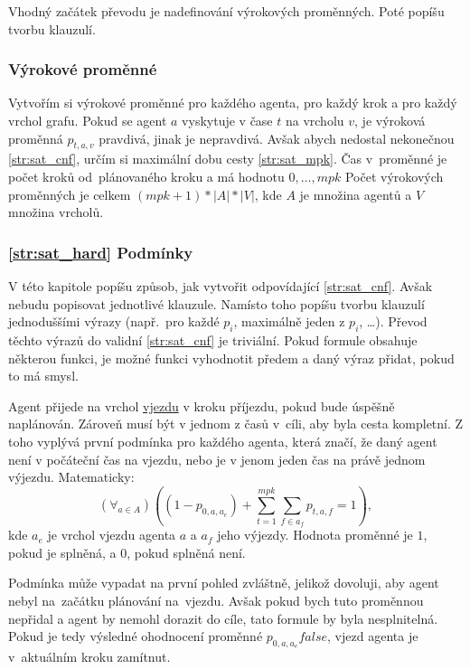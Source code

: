 Vhodný začátek převodu je nadefinování výrokových proměnných.
Poté popíšu tvorbu klauzulí.

\subsubsection{Výrokové proměnné}\label{subsubsec:sat_vyrokove_promenne}

Vytvořím si výrokové proměnné pro každého agenta, pro každý krok a pro každý vrchol grafu.
Pokud se agent $a$ vyskytuje v čase $t$ na vrcholu $v$, je výroková proměnná $p_{t,a,v}$ pravdivá, jinak je nepravdivá.
Avšak abych nedostal nekonečnou \ref{str:sat_cnf}, určím si maximální dobu cesty \ref{str:sat_mpk}.
Čas v~proměnné je počet kroků od~plánovaného kroku a má hodnotu ${0, \dots, mpk}$
Počet výrokových proměnných je celkem $(mpk + 1) * |A| * |V|$, kde $A$ je množina agentů a $V$ množina vrcholů.

\subsubsection{\ref{str:sat_hard} Podmínky}\label{subsubsec:sat_hard_podminky}

V této kapitole popíšu způsob, jak vytvořit odpovídající \ref{str:sat_cnf}.
Avšak nebudu popisovat jednotlivé klauzule.
Namísto toho popíšu tvorbu klauzulí jednoduššími výrazy (např.\ pro každé $p_i$, maximálně jeden z $p_i$, \ldots).
Převod těchto výrazů do validní \ref{str:sat_cnf} je triviální.
Pokud formule obsahuje některou funkci, je možné funkci vyhodnotit předem a daný výraz přidat, pokud to má smysl.

Agent přijede na vrchol \hyperref[par:vjezdy]{vjezdu} v kroku příjezdu, pokud bude úspěšně naplánován.
Zároveň musí být v jednom z časů v~cíli, aby byla cesta kompletní.
Z toho vyplývá první podmínka pro každého agenta, která značí, že daný agent není v počáteční čas na vjezdu,
nebo je v jenom jeden čas na právě jednom výjezdu.
Matematicky:
\[
	(\forall_{a \in A}) \left(\left(1 - p_{0,a,a_e}\right) + \sum_{t=1}^{mpk} \sum_{f \in a_f} p_{t, a, f} = 1\right),
\]
kde $a_e$ je vrchol vjezdu agenta $a$ a $a_f$ jeho výjezdy.
Hodnota proměnné je $1$, pokud je splněná, a $0$, pokud splněná není.

Podmínka může vypadat na první pohled zvláštně, jelikož dovoluji, aby agent nebyl na~začátku plánování na~vjezdu.
Avšak pokud bych tuto proměnnou nepřidal a agent by nemohl dorazit do cíle, tato formule by byla nesplnitelná.
Pokud je tedy výsledné ohodnocení proměnné $p_{0,a,a_e} false$, vjezd agenta je v~aktuálním kroku zamítnut.


